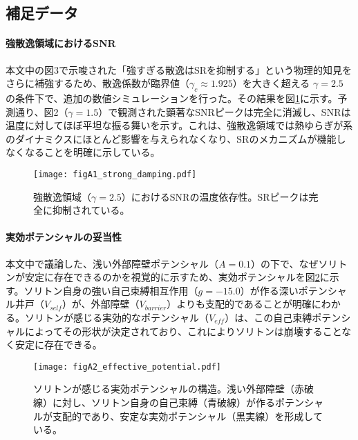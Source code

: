 \documentclass[a4paper,11pt,ja=standard,lualatex]{bxjsarticle}
\begin{document}
\subsection{補足データ}
\paragraph{強散逸領域におけるSNR}
本文中の図3で示唆された「強すぎる散逸はSRを抑制する」という物理的知見をさらに補強するため、散逸係数が臨界値（$\gamma_c \approx 1.925$）を大きく超える $\gamma=2.5$ の条件下で、追加の数値シミュレーションを行った。その結果を図\ref{fig:strong_damping}に示す。予測通り、図2（$\gamma=1.5$）で観測された顕著なSNRピークは完全に消滅し、SNRは温度に対してほぼ平坦な振る舞いを示す。これは、強散逸領域では熱ゆらぎが系のダイナミクスにほとんど影響を与えられなくなり、SRのメカニズムが機能しなくなることを明確に示している。

\begin{figure}[h!]
  \centering
  \texttt{[image: figA1\_strong\_damping.pdf]}
  \caption{強散逸領域（$\gamma=2.5$）におけるSNRの温度依存性。SRピークは完全に抑制されている。}
  \label{fig:strong_damping}
\end{figure}

\paragraph{実効ポテンシャルの妥当性}
本文中で議論した、浅い外部障壁ポテンシャル（$A=0.1$）の下で、なぜソリトンが安定に存在できるのかを視覚的に示すため、実効ポテンシャルを図\ref{fig:effective_potential}に示す。ソリトン自身の強い自己束縛相互作用（$g=-15.0$）が作る深いポテンシャル井戸（$V_{self}$）が、外部障壁（$V_{barrier}$）よりも支配的であることが明確にわかる。ソリトンが感じる実効的なポテンシャル（$V_{eff}$）は、この自己束縛ポテンシャルによってその形状が決定されており、これによりソリトンは崩壊することなく安定に存在できる。

\begin{figure}[h!]
    \centering
    \texttt{[image: figA2\_effective\_potential.pdf]}
    \caption{ソリトンが感じる実効ポテンシャルの構造。浅い外部障壁（赤破線）に対し、ソリトン自身の自己束縛（青破線）が作るポテンシャルが支配的であり、安定な実効ポテンシャル（黒実線）を形成している。}
    \label{fig:effective_potential}
\end{figure}
\end{document}

